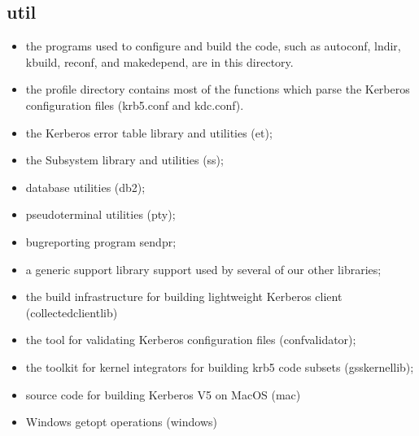 \documentclass[letterpaper,10pt,english]{sphinxmanual}
\begin{document}
\subsection{util}
\label{\detokenize{build/directory_org:util}}\label{\detokenize{build/directory_org:id2}}\begin{description}
\begin{itemize}
\item {} 
\sphinxAtStartPar
the programs used to configure and build the code, such as
autoconf, lndir, kbuild, reconf, and makedepend, are in this
directory.

\item {} 
\sphinxAtStartPar
the profile directory contains most of the functions which parse
the Kerberos configuration files (krb5.conf and kdc.conf).

\item {} 
\sphinxAtStartPar
the Kerberos error table library and utilities (et);

\item {} 
\sphinxAtStartPar
the Sub\sphinxhyphen{}system library and utilities (ss);

\item {} 
\sphinxAtStartPar
database utilities (db2);

\item {} 
\sphinxAtStartPar
pseudo\sphinxhyphen{}terminal utilities (pty);

\item {} 
\sphinxAtStartPar
bug\sphinxhyphen{}reporting program send\sphinxhyphen{}pr;

\item {} 
\sphinxAtStartPar
a generic support library support used by several of our other
libraries;

\item {} 
\sphinxAtStartPar
the build infrastructure for building lightweight Kerberos client
(collected\sphinxhyphen{}client\sphinxhyphen{}lib)

\item {} 
\sphinxAtStartPar
the tool for validating Kerberos configuration files
(confvalidator);

\item {} 
\sphinxAtStartPar
the toolkit for kernel integrators for building krb5 code subsets
(gss\sphinxhyphen{}kernel\sphinxhyphen{}lib);

\item {} 
\sphinxAtStartPar
source code for building Kerberos V5 on MacOS (mac)

\item {} 
\sphinxAtStartPar
Windows getopt operations (windows)

\end{itemize}

\end{description}
\end{document}
